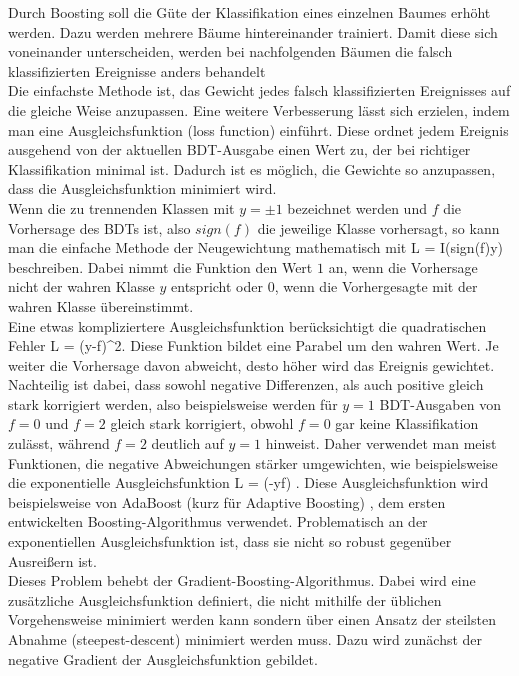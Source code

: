 Durch Boosting soll die G\"ute der Klassifikation eines einzelnen Baumes erh\"oht werden. Dazu werden mehrere B\"aume hintereinander trainiert. Damit diese sich voneinander unterscheiden, werden bei nachfolgenden B\"aumen die falsch klassifizierten Ereignisse anders behandelt\\
Die einfachste Methode ist, das Gewicht jedes falsch klassifizierten Ereignisses auf die gleiche Weise anzupassen. Eine weitere Verbesserung l\"asst sich erzielen, indem man eine Ausgleichsfunktion (loss function) einf\"uhrt. Diese ordnet jedem Ereignis ausgehend von der aktuellen BDT-Ausgabe einen Wert zu, der bei richtiger Klassifikation minimal ist. Dadurch ist es m\"oglich, die Gewichte so anzupassen, dass die Ausgleichsfunktion minimiert wird.\\
Wenn die zu trennenden Klassen mit $y=\pm1$ bezeichnet werden und $f$ die Vorhersage des BDTs ist, also $sign(f)$ die jeweilige Klasse vorhersagt, so kann man die einfache Methode der Neugewichtung mathematisch mit
\beq
L = I(sign(f)\neq y)
\label{eq:missclass_loss}
\eeq
beschreiben. Dabei nimmt die Funktion den Wert $1$ an, wenn die Vorhersage nicht der wahren Klasse $y$ entspricht oder $0$, wenn die Vorhergesagte mit der wahren Klasse \"ubereinstimmt.\\
Eine etwas kompliziertere Ausgleichsfunktion ber\"ucksichtigt die quadratischen Fehler
\beq
L = (y-f)^2.
\label{eq:squarederror_loss}
\eeq
Diese Funktion bildet eine Parabel um den wahren Wert. Je weiter die Vorhersage davon abweicht, desto h\"oher wird das Ereignis gewichtet. Nachteilig ist dabei, dass sowohl negative Differenzen, als auch positive gleich stark korrigiert werden, also beispielsweise werden f\"ur $y=1$ BDT-Ausgaben von $f=0$ und $f=2$ gleich stark korrigiert, obwohl $f=0$ gar keine Klassifikation zul\"asst, w\"ahrend $f=2$ deutlich auf $y=1$ hinweist. Daher verwendet man meist Funktionen, die negative Abweichungen st\"arker umgewichten, wie beispielsweise die exponentielle Ausgleichsfunktion
\beq
L = \exp(-y\cdot f)
\label{eq:exp_loss}.
\eeq
Diese Ausgleichsfunktion wird beispielsweise von AdaBoost (kurz f\"ur Adaptive Boosting) \cite{ADABoost}, dem ersten entwickelten Boosting-Algorithmus verwendet. Problematisch an der exponentiellen Ausgleichsfunktion ist, dass sie nicht so robust gegen\"uber Ausrei\ss ern ist.\\
Dieses Problem behebt der Gradient-Boosting-Algorithmus. Dabei wird eine zus\"atzliche Ausgleichsfunktion definiert, die nicht mithilfe der \"ublichen Vorgehensweise minimiert werden kann sondern \"uber einen Ansatz der steilsten Abnahme (steepest-descent) minimiert werden muss. Dazu wird zun\"achst der negative Gradient der Ausgleichsfunktion gebildet.
